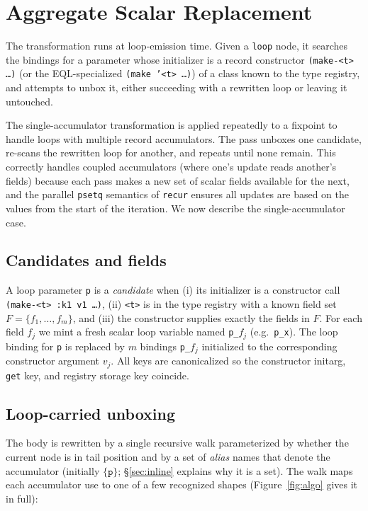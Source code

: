 \documentclass[sigplan,screen,review,anonymous]{acmart}
\begin{document}
\section{Aggregate Scalar Replacement}
\label{sec:algo}

The transformation runs at loop-emission time. Given a \texttt{loop} node, it
searches the bindings for a parameter whose initializer is a record constructor
\texttt{(make-<t> \ldots)} (or the EQL-specialized \texttt{(make '<t> \ldots)})
of a class known to the type registry, and attempts
to unbox it, either succeeding with a rewritten loop or leaving it untouched.

The single-accumulator transformation is applied repeatedly to a fixpoint to
handle loops with multiple record accumulators. The pass unboxes one candidate,
re-scans the rewritten loop for another, and repeats until none remain.
This correctly handles coupled accumulators (where one's
update reads another's fields) because each pass makes a new set of scalar
fields available for the next, and the parallel \texttt{psetq} semantics of
\texttt{recur} ensures all updates are based on the values from the start of the
iteration. We now describe the single-accumulator case.

\subsection{Candidates and fields}
\label{sec:cand}

A loop parameter \texttt{p} is a \emph{candidate} when (i) its initializer is a
constructor call \texttt{(make-<t> :k1 v1 \ldots)}, (ii) \texttt{<t>} is in the
type registry with a known field set $F = \{f_1,\ldots,f_m\}$, and (iii) the
constructor supplies exactly the fields in $F$. For each field $f_j$ we mint a
fresh scalar loop variable named \texttt{p\_}$f_j$ (e.g.\ \texttt{p\_x}). The
loop binding for \texttt{p} is replaced by $m$ bindings \texttt{p\_}$f_j$
initialized to the corresponding constructor argument $v_j$. All keys are
canonicalized so the constructor initarg, \texttt{get} key, and registry
storage key coincide.

\subsection{Loop-carried unboxing}
\label{sec:loop}

The body is rewritten by a single recursive walk parameterized by whether the
current node is in tail position and by a set of \emph{alias} names that denote
the accumulator (initially $\{\texttt{p}\}$; \S\ref{sec:inline} explains why it
is a set). The walk maps each accumulator use to one of a few recognized
shapes (Figure~\ref{fig:algo} gives it in full):
\end{document}
